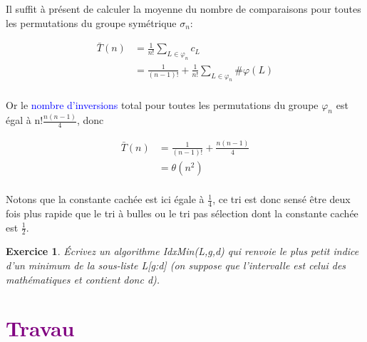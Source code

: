 \documentclass[a4paper,10pt]{article}
\newtheorem{exo}{Exercice}
\begin{document}
Il suffit à présent de calculer la moyenne du nombre de comparaisons pour toutes les permutations du groupe 
symétrique $\sigma_n$:

\begin{align*}
    \bar{T}(n) & = \frac{1}{n!} \sum_{L \in \varphi_n}c_L \\
               & = \frac{1}{(n-1)!} + \frac{1}{n!} \sum_{L \in \varphi_n}\#\varphi(L) \\
\end{align*}

Or le \textcolor{blue}{nombre d'inversions} total pour toutes les permutations du groupe $\varphi_n$ est égal 
à n!$\frac{n(n-1)}{4}$, donc

\begin{align*}
    \bar{T}(n) & = \frac{1}{(n-1)!} + \frac{n(n-1)}{4} \\
               & = \theta(n^2) \\
\end{align*}

Notons que la constante cachée est ici égale à $\frac{1}{4}$, ce tri est donc sensé être deux fois plus rapide que 
le tri à bulles ou le tri pas sélection dont la constante cachée est $\frac{1}{2}$.

\begin{exo}
    Écrivez un algorithme IdxMin(L,g,d) qui renvoie le plus petit indice d'un minimum de la sous-liste L[g:d]
    (on suppose que l'intervalle est celui des mathématiques et contient donc d).
\end{exo}

\section{\textcolor{purple}{Travau}}
\end{document}
